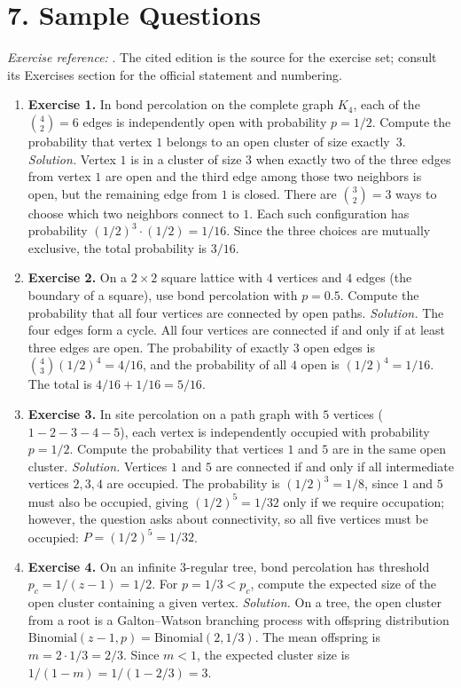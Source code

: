 \section*{7. Sample Questions}
\emph{Exercise reference:} \cite{percolation_ref1}. The cited edition is the source for the exercise set; consult its Exercises section for the official statement and numbering.
\begin{enumerate}[leftmargin=*,itemsep=0.9em]
\item \textbf{Exercise 1.} In bond percolation on the complete graph $K_4$, each of the $\binom{4}{2}=6$ edges is independently open with probability $p=1/2$. Compute the probability that vertex $1$ belongs to an open cluster of size exactly~$3$. \emph{Solution.} Vertex $1$ is in a cluster of size $3$ when exactly two of the three edges from vertex $1$ are open and the third edge among those two neighbors is open, but the remaining edge from $1$ is closed. There are $\binom{3}{2}=3$ ways to choose which two neighbors connect to $1$. Each such configuration has probability $(1/2)^3\cdot(1/2)=1/16$. Since the three choices are mutually exclusive, the total probability is $3/16$.

\item \textbf{Exercise 2.} On a $2\times 2$ square lattice with $4$ vertices and $4$ edges (the boundary of a square), use bond percolation with $p=0.5$. Compute the probability that all four vertices are connected by open paths. \emph{Solution.} The four edges form a cycle. All four vertices are connected if and only if at least three edges are open. The probability of exactly $3$ open edges is $\binom{4}{3}(1/2)^4=4/16$, and the probability of all $4$ open is $(1/2)^4=1/16$. The total is $4/16+1/16=5/16$.

\item \textbf{Exercise 3.} In site percolation on a path graph with $5$ vertices ($1{-}2{-}3{-}4{-}5$), each vertex is independently occupied with probability $p=1/2$. Compute the probability that vertices $1$ and $5$ are in the same open cluster. \emph{Solution.} Vertices $1$ and $5$ are connected if and only if all intermediate vertices $2,3,4$ are occupied. The probability is $(1/2)^3=1/8$, since $1$ and $5$ must also be occupied, giving $(1/2)^5=1/32$ only if we require occupation; however, the question asks about connectivity, so all five vertices must be occupied: $P=(1/2)^5=1/32$.

\item \textbf{Exercise 4.} On an infinite $3$-regular tree, bond percolation has threshold $p_c=1/(z-1)=1/2$. For $p=1/3<p_c$, compute the expected size of the open cluster containing a given vertex. \emph{Solution.} On a tree, the open cluster from a root is a Galton--Watson branching process with offspring distribution $\text{Binomial}(z-1,p)=\text{Binomial}(2,1/3)$. The mean offspring is $m=2\cdot 1/3=2/3$. Since $m<1$, the expected cluster size is $1/(1-m)=1/(1-2/3)=3$.


\end{enumerate}

